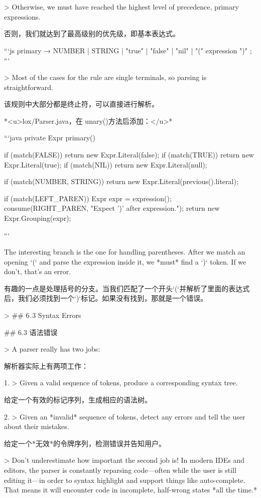 \documentclass[cn,11pt,chinese]{elegantbook}
\begin{document}
> Otherwise, we must have reached the highest level of precedence, primary expressions.

否则，我们就达到了最高级别的优先级，即基本表达式。

```js
primary        → NUMBER | STRING | "true" | "false" | "nil"
               | "(" expression ")" ;
```

> Most of the cases for the rule are single terminals, so parsing is straightforward.

该规则中大部分都是终止符，可以直接进行解析。

*<u>lox/Parser.java，在 unary()方法后添加：</u>*

```java
  private Expr primary() {
    if (match(FALSE)) return new Expr.Literal(false);
    if (match(TRUE)) return new Expr.Literal(true);
    if (match(NIL)) return new Expr.Literal(null);

    if (match(NUMBER, STRING)) {
      return new Expr.Literal(previous().literal);
    }

    if (match(LEFT_PAREN)) {
      Expr expr = expression();
      consume(RIGHT_PAREN, "Expect ')' after expression.");
      return new Expr.Grouping(expr);
    }
  }
```

The interesting branch is the one for handling parentheses. After we match an opening `(` and parse the expression inside it, we *must* find a `)` token. If we don’t, that’s an error.

有趣的一点是处理括号的分支。当我们匹配了一个开头`(`并解析了里面的表达式后，我们必须找到一个`)`标记。如果没有找到，那就是一个错误。

> ## 6 . 3 Syntax Errors

## 6.3 语法错误

> A parser really has two jobs:

解析器实际上有两项工作：

1. > Given a valid sequence of tokens, produce a corresponding syntax tree.

   给定一个有效的标记序列，生成相应的语法树。

2. > Given an *invalid* sequence of tokens, detect any errors and tell the user about their mistakes.

   给定一个*无效*的令牌序列，检测错误并告知用户。

> Don’t underestimate how important the second job is! In modern IDEs and editors, the parser is constantly reparsing code—often while the user is still editing it—in order to syntax highlight and support things like auto-complete. That means it will encounter code in incomplete, half-wrong states *all the time.*
\end{document}
